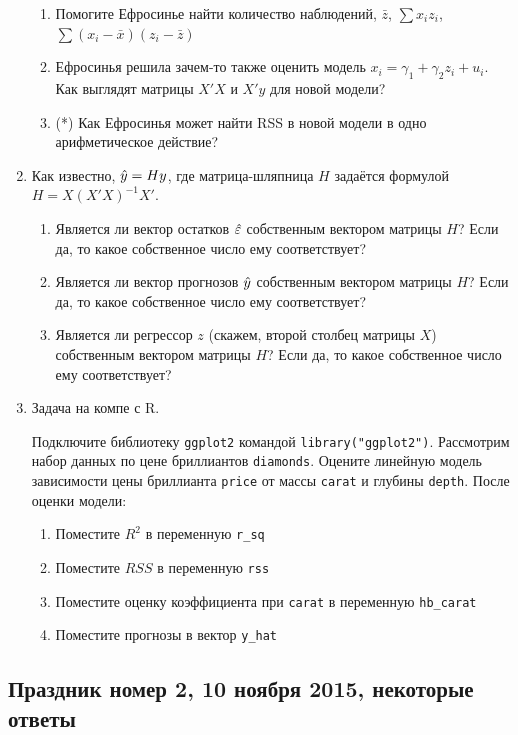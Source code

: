 \documentclass[12pt, a4paper]{article}\usepackage[]{graphicx}\usepackage[]{color}
\begin{document}
\begin{enumerate}
\begin{enumerate}
\item Помогите Ефросинье найти количество наблюдений, $\bar{z}$, $\sum x_i z_i$, $\sum(x_i-\bar{x})(z_i-\bar{z})$
\item Ефросинья решила зачем-то также оценить модель $x_i = \gamma_1 + \gamma_2 z_i + u_i$. Как выглядят матрицы $X'X$ и $X'y$ для новой модели?
\item (*) Как Ефросинья может найти RSS в новой модели в одно арифметическое действие?
\end{enumerate}


\item Как известно, $\hat{y}=H y$, где матрица-шляпница $H$ задаётся формулой $H=X(X'X)^{-1}X'$.
\begin{enumerate}
\item Является ли вектор остатков $\hat{\varepsilon}$ собственным вектором матрицы $H$? Если да, то какое собственное число ему соответствует?
\item Является ли вектор прогнозов $\hat{y}$ собственным вектором матрицы $H$? Если да, то какое собственное число ему соответствует?
\item  Является ли регрессор $z$ (скажем, второй столбец матрицы $X$) собственным вектором матрицы $H$? Если да, то какое собственное число ему соответствует?
\end{enumerate}

\item Задача на компе с R.

Подключите библиотеку \verb|ggplot2| командой \verb|library("ggplot2")|. Рассмотрим набор данных по цене бриллиантов \verb|diamonds|. Оцените линейную модель зависимости цены бриллианта \verb|price| от массы \verb|carat| и глубины \verb|depth|. После оценки модели:
\begin{enumerate}
\item Поместите $R^2$ в переменную \verb|r_sq|
\item Поместите $RSS$ в переменную \verb|rss|
\item Поместите оценку коэффициента при \verb|carat| в переменную \verb|hb_carat|
\item Поместите прогнозы в вектор \verb|y_hat|
\end{enumerate}

\end{enumerate}


\subsection{Праздник номер 2, 10 ноября 2015, некоторые ответы}
\end{document}
